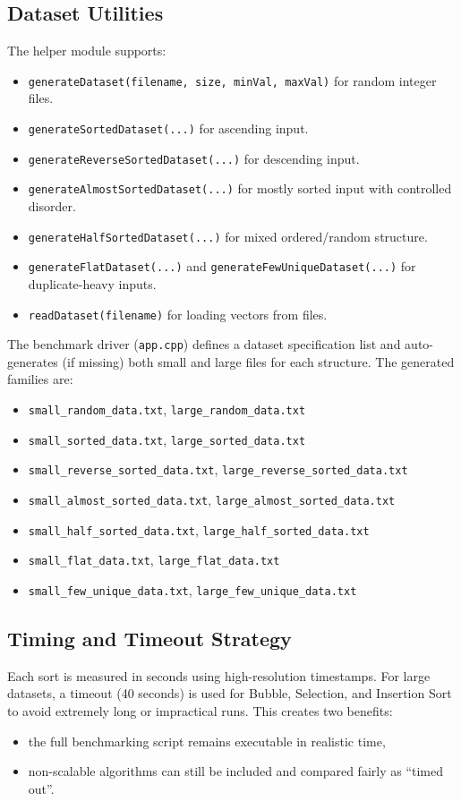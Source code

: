 \documentclass[12pt,a4paper]{article}
\begin{document}
\subsection{Dataset Utilities}
The helper module supports:
\begin{itemize}
    \item \texttt{generateDataset(filename, size, minVal, maxVal)} for random integer files.
    \item \texttt{generateSortedDataset(...)} for ascending input.
    \item \texttt{generateReverseSortedDataset(...)} for descending input.
    \item \texttt{generateAlmostSortedDataset(...)} for mostly sorted input with controlled disorder.
    \item \texttt{generateHalfSortedDataset(...)} for mixed ordered/random structure.
    \item \texttt{generateFlatDataset(...)} and \texttt{generateFewUniqueDataset(...)} for duplicate-heavy inputs.
    \item \texttt{readDataset(filename)} for loading vectors from files.
\end{itemize}

The benchmark driver (\texttt{app.cpp}) defines a dataset specification list and auto-generates (if missing) both small and large files for each structure. The generated families are:
\begin{itemize}
    \item \texttt{small\_random\_data.txt}, \texttt{large\_random\_data.txt}
    \item \texttt{small\_sorted\_data.txt}, \texttt{large\_sorted\_data.txt}
    \item \texttt{small\_reverse\_sorted\_data.txt}, \texttt{large\_reverse\_sorted\_data.txt}
    \item \texttt{small\_almost\_sorted\_data.txt}, \texttt{large\_almost\_sorted\_data.txt}
    \item \texttt{small\_half\_sorted\_data.txt}, \texttt{large\_half\_sorted\_data.txt}
    \item \texttt{small\_flat\_data.txt}, \texttt{large\_flat\_data.txt}
    \item \texttt{small\_few\_unique\_data.txt}, \texttt{large\_few\_unique\_data.txt}
\end{itemize}

\subsection{Timing and Timeout Strategy}
Each sort is measured in seconds using high-resolution timestamps. For large datasets, a timeout (40 seconds) is used for Bubble, Selection, and Insertion Sort to avoid extremely long or impractical runs. This creates two benefits:
\begin{itemize}
    \item the full benchmarking script remains executable in realistic time,
    \item non-scalable algorithms can still be included and compared fairly as ``timed out''.
\end{itemize}
\end{document}
